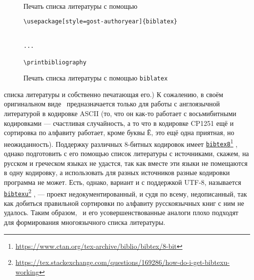 \documentclass[a4paper,12pt]{article}
\newcommand\foothref[2]{%
  \href{#1}{#2}\footnote{\url{#1}}%
}
\newcommand\package[1]{\texttt{#1}}
\newcommand\exe[1]{\texttt{#1}}
\begin{document}
\begin{figure}[tp]
\begin{tcolorbox}
\footnotesize
\begin{verbatim}


\end{verbatim}
\end{tcolorbox}
\caption{Печать списка литературы с помощью \BibTeX}\label{bibliography}
\end{figure}
\begin{figure}[tp]
\begin{tcolorbox}
\footnotesize
\begin{verbatim}
\usepackage[style=gost-authoryear]{biblatex}


...

\printbibliography
\end{verbatim}
\end{tcolorbox}
\caption{Печать списка литературы с помощью \package{biblatex}}\label{biblatex1}
\end{figure}
списка литературы и собственно печатающая его.)
К сожалению, в своём оригинальном виде \BibTeX\ предназначается только
для работы с англоязычной литературой в кодировке ASCII (то, что
он как-то работает с восьмибитными кодировками --- счастливая случайность,
а то что в кодировке CP1251 ещё и сортировка по алфавиту работает,
кроме буквы Ё, это ещё одна приятная, но неожиданность). Поддержку различных
8-битных кодировок имеет
\foothref{https://www.ctan.org/tex-archive/biblio/bibtex/8-bit}{\exe{bibtex8}},
однако подготовить с его помощью
список литературы с источниками, скажем, на русском и греческом языках
не удастся, так как вместе эти языки не помещаются в одну кодировку, а
использовать для разных источников разные кодировки программа не может.
Есть, однако, вариант и с поддержкой UTF-8, называется
\foothref{https://tex.stackexchange.com/questions/169286/how-do-i-get-bibtexu-working}{\exe{bibtexu}},
--- проект недокументированный, и судя по всему, недописанный, так как
добиться правильной сортировки по алфавиту русскоязычных книг с ним
не удалось. Таким образом, \BibTeX\ и его усовершенствованные аналоги
плохо подходят для формирования многоязычного списка литературы.
\end{document}
